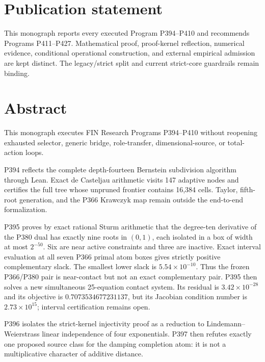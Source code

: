 \documentclass[11pt,a4paper,openany]{report}
\begin{document}
\chapter*{Publication statement}
This monograph reports every executed Program P394--P410 and recommends
Programs P411--P427. Mathematical proof, proof-kernel reflection, numerical
evidence, conditional operational construction, and external empirical
admission are kept distinct. The legacy/strict split and current strict-core
guardrails remain binding.

\tableofcontents
\clearpage
{}

\chapter*{Abstract}

This monograph executes FIN Research Programs P394--P410 without reopening
exhausted selector, generic bridge, role-transfer, dimensional-source, or
total-action loops.

P394 reflects the complete depth-fourteen Bernstein subdivision algorithm
through Lean. Exact de Casteljau arithmetic visits 147 adaptive nodes and
certifies the full tree whose unpruned frontier contains 16,384 cells.
Taylor, fifth-root generation, and the P366 Krawczyk map remain outside the
end-to-end formalization.

P395 proves by exact rational Sturm arithmetic that the degree-ten derivative
of the P380 dual has exactly nine roots in $(0,1)$, each isolated in a box of
width at most $2^{-50}$. Six are near active constraints and three are
inactive. Exact interval evaluation at all seven P366 primal atom boxes gives
strictly positive complementary slack. The smallest lower slack is
$5.54\times10^{-10}$. Thus the frozen P366/P380 pair is near-contact but not
an exact complementary pair. P395 then solves a new simultaneous
25-equation contact system. Its residual is $3.42\times10^{-28}$ and its
objective is $0.7073534677231137$, but its Jacobian condition number is
$2.73\times10^{15}$; interval certification remains open.

P396 isolates the strict-kernel injectivity proof as a reduction to
Lindemann--Weierstrass linear independence of four exponentials. P397 then
refutes exactly one proposed source class for the damping completion atom:
it is not a multiplicative character of additive distance.
\end{document}
